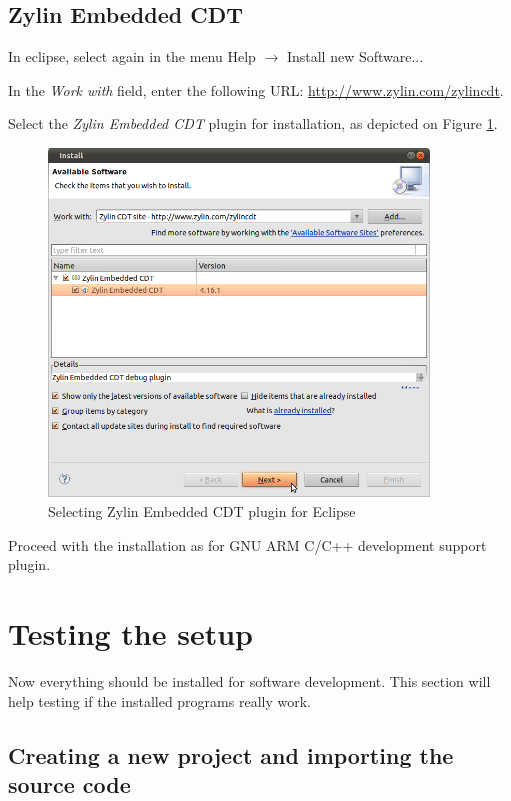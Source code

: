 \documentclass[a4paper, 10pt]{article}
\begin{document}
\subsection{Zylin Embedded CDT}

In eclipse, select again in the menu Help $\rightarrow$ Install new Software...

In the \emph{Work with} field, enter the following URL:
\url{http://www.zylin.com/zylincdt}.

Select the \emph{Zylin Embedded CDT} plugin for installation,
as depicted on Figure \ref{fig:eclipse-zylin}.

    \begin{figure}[H]
    \centering
        \includegraphics[width=0.9\textwidth]{./png-install-guide/eclipse-zylin.png}
        \caption{Selecting Zylin Embedded CDT plugin for Eclipse}
        \label{fig:eclipse-zylin}
    \end{figure}

Proceed with the installation as for GNU ARM C/C++ development support plugin.


\section{Testing the setup}

Now everything should be installed for software development.
This section will help testing if the installed programs really work.

\subsection{Creating a new project and importing the source code}
\end{document}

